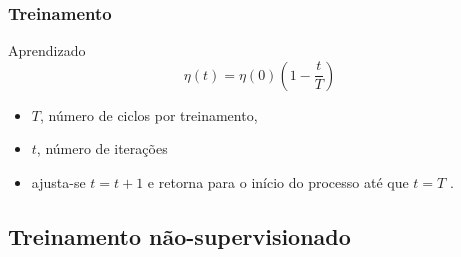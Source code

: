 \documentclass[10pt]{beamer} %
\begin{document}
\begin{frame}
	\frametitle{Treinamento}
	\begin{block}{Aprendizado}
		\begin{equation}
		\eta(t)=\eta(0)    ( 1 -  \frac{t}{T}  )  
		\label{aprendizado}
		\end{equation}
	\end{block}
	\begin{itemize}
		\pause
		\item $T$, número de ciclos por treinamento,
		\pause
		\item $t$, número de iterações
		\pause
		\item ajusta-se $t=t+1$ e retorna para o início do processo até que $t=T$ \citep{YANG2009,Yan2014}.
	\end{itemize}
\end{frame}



\subsection{Treinamento não-supervisionado}
\end{document}
